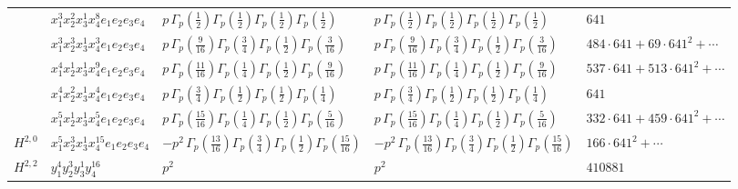 \documentclass[11pt]{article}
\begin{document}
\begin{table}[ht]
{\begin{tabular}{@{}lllll@{}}
 & $x_{1}^{3} x_{2}^{2} x_{3}^{1} x_{4}^{8}  e_{1} e_{2} e_{3} e_{4}$ & $p \, \Gamma_p \left( \frac{1}{2} \right) \Gamma_p \left( \frac{1}{2} \right) \Gamma_p \left( \frac{1}{2} \right) \Gamma_p \left( \frac{1}{2} \right)$ & $p \, \Gamma_p \left( \frac{1}{2} \right) \Gamma_p \left( \frac{1}{2} \right) \Gamma_p \left( \frac{1}{2} \right) \Gamma_p \left( \frac{1}{2} \right)$ & $641$ \\
 & $x_{1}^{3} x_{2}^{3} x_{3}^{1} x_{4}^{3}  e_{1} e_{2} e_{3} e_{4}$ & $p \, \Gamma_p \left( \frac{9}{16} \right) \Gamma_p \left( \frac{3}{4} \right) \Gamma_p \left( \frac{1}{2} \right) \Gamma_p \left( \frac{3}{16} \right)$ & $p \, \Gamma_p \left( \frac{9}{16} \right) \Gamma_p \left( \frac{3}{4} \right) \Gamma_p \left( \frac{1}{2} \right) \Gamma_p \left( \frac{3}{16} \right)$ & $484{\cdot}641{+}69{\cdot}641^{2}{+}\cdots$ \\
 & $x_{1}^{4} x_{2}^{1} x_{3}^{1} x_{4}^{9}  e_{1} e_{2} e_{3} e_{4}$ & $p \, \Gamma_p \left( \frac{11}{16} \right) \Gamma_p \left( \frac{1}{4} \right) \Gamma_p \left( \frac{1}{2} \right) \Gamma_p \left( \frac{9}{16} \right)$ & $p \, \Gamma_p \left( \frac{11}{16} \right) \Gamma_p \left( \frac{1}{4} \right) \Gamma_p \left( \frac{1}{2} \right) \Gamma_p \left( \frac{9}{16} \right)$ & $537{\cdot}641{+}513{\cdot}641^{2}{+}\cdots$ \\
 & $x_{1}^{4} x_{2}^{2} x_{3}^{1} x_{4}^{4}  e_{1} e_{2} e_{3} e_{4}$ & $p \, \Gamma_p \left( \frac{3}{4} \right) \Gamma_p \left( \frac{1}{2} \right) \Gamma_p \left( \frac{1}{2} \right) \Gamma_p \left( \frac{1}{4} \right)$ & $p \, \Gamma_p \left( \frac{3}{4} \right) \Gamma_p \left( \frac{1}{2} \right) \Gamma_p \left( \frac{1}{2} \right) \Gamma_p \left( \frac{1}{4} \right)$ & $641$ \\
 & $x_{1}^{5} x_{2}^{1} x_{3}^{1} x_{4}^{5}  e_{1} e_{2} e_{3} e_{4}$ & $p \, \Gamma_p \left( \frac{15}{16} \right) \Gamma_p \left( \frac{1}{4} \right) \Gamma_p \left( \frac{1}{2} \right) \Gamma_p \left( \frac{5}{16} \right)$ & $p \, \Gamma_p \left( \frac{15}{16} \right) \Gamma_p \left( \frac{1}{4} \right) \Gamma_p \left( \frac{1}{2} \right) \Gamma_p \left( \frac{5}{16} \right)$ & $332{\cdot}641{+}459{\cdot}641^{2}{+}\cdots$ \\
\midrule
$H^{2,0}$ & $x_{1}^{5} x_{2}^{3} x_{3}^{1} x_{4}^{15}  e_{1} e_{2} e_{3} e_{4}$ & $- p^{2} \, \Gamma_p \left( \frac{13}{16} \right) \Gamma_p \left( \frac{3}{4} \right) \Gamma_p \left( \frac{1}{2} \right) \Gamma_p \left( \frac{15}{16} \right)$ & $- p^{2} \, \Gamma_p \left( \frac{13}{16} \right) \Gamma_p \left( \frac{3}{4} \right) \Gamma_p \left( \frac{1}{2} \right) \Gamma_p \left( \frac{15}{16} \right)$ & $166{\cdot}641^{2}{+}\cdots$ \\
\midrule
$H^{2,2}$ & $y_{1}^{4} y_{2}^{3} y_{3}^{1} y_{4}^{16}$ & $p^{2} \,$ & $p^{2} \,$ & $410881$ \\
\bottomrule
\end{tabular}
}
\renewcommand{\arraystretch}{1.0}
\end{table}
\end{document}
